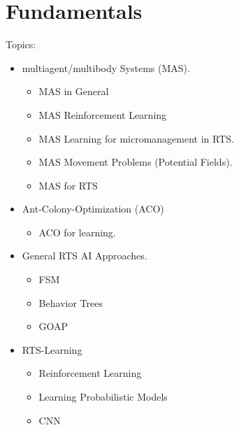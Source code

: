 
\chapter{Fundamentals}
\label{ch:Fundamentals}

Topics:
\begin{itemize}[noitemsep,nolistsep]
	\item multiagent/multibody Systems (MAS).
	\begin{itemize}[noitemsep,nolistsep]
		\item MAS in General
		\item MAS Reinforcement Learning
		\item MAS Learning for micromanagement in RTS.
		\item MAS Movement Problems (Potential Fields).
		\item MAS for RTS
	\end{itemize}
	\item Ant-Colony-Optimization (ACO)
	\begin{itemize}[noitemsep,nolistsep]
		\item ACO for learning.
	\end{itemize}
	\item General RTS AI Approaches.
	\begin{itemize}[noitemsep,nolistsep]
		\item FSM
		\item Behavior Trees
		\item GOAP
	\end{itemize}
	\item RTS-Learning
	\begin{itemize}[noitemsep,nolistsep]
		\item Reinforcement Learning
		\item Learning Probabilistic Models
		\item CNN
	\end{itemize}
\end{itemize}
